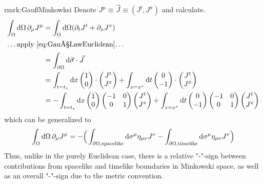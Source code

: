 \begin{rmrk}{rmrk:GaußMinkowksi}
    Denote $J^\mu\equiv\vec{J}\equiv(J^t,J^x)$ and calculate.
    \begin{subequations}
        \begin{align}
            \int_\Omega\text{d}\Omega\,\partial_\mu J^\mu&=\int_\Omega\text{d}\Omega(\partial_tJ^t+\partial_xJ^x)\\
            \intertext{\dots apply \ref{eq:GaußLawEuclidean}\dots}
            &=\int_{\partial\Omega}\text{d}\vec{\sigma}\cdot \vec{J}\\
            &=\int_{t=t_\star}\text{d} x\begin{pmatrix}
                1\\0
            \end{pmatrix}\cdot\begin{pmatrix}
                J^t\\J^x
            \end{pmatrix}
            +\int_{x=x^\star}\text{d} t\begin{pmatrix}
                0\\-1
            \end{pmatrix}\cdot\begin{pmatrix}
                J^t\\J^x
            \end{pmatrix}\\
            &=-\int_{t=t_\star}\text{d} x\begin{pmatrix}
                1\\0
            \end{pmatrix}\begin{pmatrix}
            -1&0\\0&1
            \end{pmatrix}\begin{pmatrix}
                J^t\\J^x
            \end{pmatrix}
            +\int_{x=x^\star}\text{d} t\begin{pmatrix}
                0\\-1
            \end{pmatrix}\begin{pmatrix}
                -1&0\\0&1
            \end{pmatrix}\begin{pmatrix}
                J^t\\J^x
            \end{pmatrix}
        \end{align}
    \end{subequations}
    which can be generalized to
    \begin{equation}
        \int_\Omega\text{d}\Omega\,\partial_\mu J^\mu=-\Big(\int_{\partial\Omega,\text{spacelike}}\text{d}\sigma^\mu\eta_{\mu\nu}J^\nu-\int_{\partial\Omega,\text{timelike}}\text{d}\sigma^\mu\eta_{\mu\nu}J^\nu\Big)
    \end{equation}
    Thus, unlike in the purely Euclidean case, there is a relative "-"-sign between contributions from spacelike and timelike boundaries in Minkowski space, as well as an overall "-"-sign due to the metric convention.
\end{rmrk}

